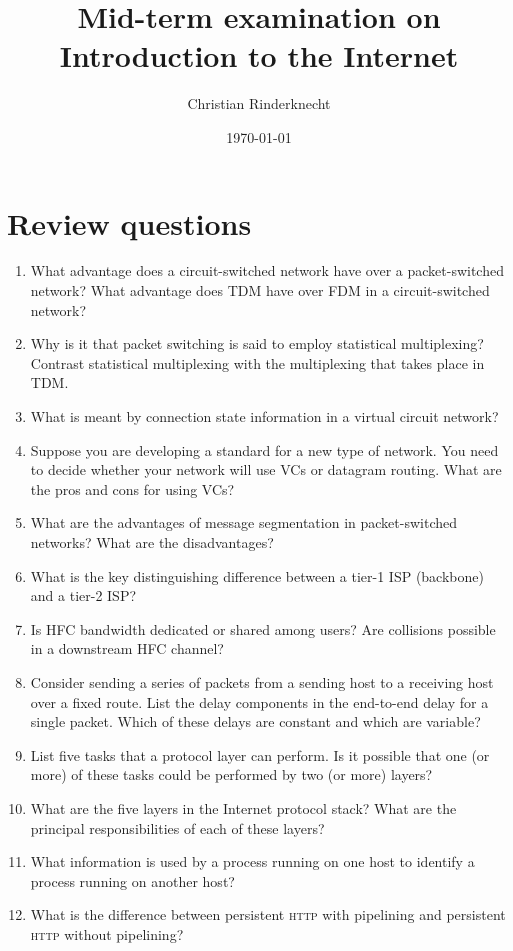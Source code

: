 \documentclass[12pt,a4paper]{article}
\title{Mid-term examination on Introduction to the Internet}
\author{Christian Rinderknecht}
\date{\today}
\begin{document}
\maketitle

\section{Review questions}

\begin{enumerate}

  \item What advantage does a circuit-switched network have over a
    packet-switched network? What advantage does TDM have over FDM in
    a circuit-switched network?

  \item Why is it that packet switching is said to employ statistical
    multiplexing? Contrast statistical multiplexing with the
    multiplexing that takes place in TDM.

  \item What is meant by connection state information in a virtual
    circuit network?

  \item Suppose you are developing a standard for a new type of
    network. You need to decide whether your network will use VCs or
    datagram routing. What are the pros and cons for using VCs?

  \item What are the advantages of message segmentation in
    packet-switched networks? What are the disadvantages?

  \item What is the key distinguishing difference between a tier-1 ISP
    (backbone) and a tier-2 ISP?

  \item Is HFC bandwidth dedicated or shared among users? Are
    collisions possible in a downstream HFC channel?

  \item Consider sending a series of packets from a sending host to a
    receiving host over a fixed route. List the delay components in
    the end-to-end delay for a single packet. Which of these delays
    are constant and which are variable?

  \item List five tasks that a protocol layer can perform. Is it
    possible that one (or more) of these tasks could be performed by
    two (or more) layers?

  \item What are the five layers in the Internet protocol stack? What
    are the principal responsibilities of each of these layers?

  \item What information is used by a process running on one host to
    identify a process running on another host?

  \item What is the difference between persistent \textsc{http}
    with pipelining and persistent \textsc{http} without pipelining?

\end{enumerate}
\end{document}
